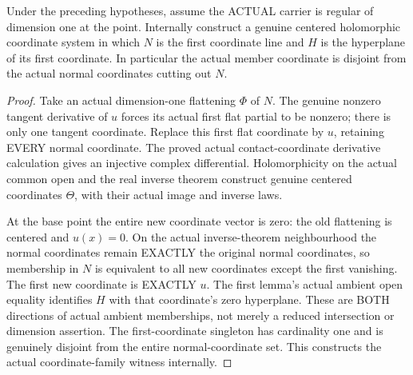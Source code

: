 \begin{theorem}
\label{hir:sharp-actual-order-one-curve-member-simultaneous-coordinates}
\leanok
Under the preceding hypotheses, assume the ACTUAL carrier is regular of
dimension one at the point. Internally construct a genuine centered
holomorphic coordinate system in which $N$ is the first coordinate
line and $H$ is the hyperplane of its first coordinate. In particular
the actual member coordinate is disjoint from the actual normal
coordinates cutting out $N$.
\end{theorem}
\begin{proof}
Take an actual dimension-one flattening $\Phi$ of $N$. The genuine
nonzero tangent derivative of $u$ forces its actual first flat partial
to be nonzero; there is only one tangent coordinate. Replace this first
flat coordinate by $u$, retaining EVERY normal coordinate. The proved
actual contact-coordinate derivative calculation gives an injective
complex differential. Holomorphicity on the actual common open and
the real inverse theorem construct genuine centered coordinates
$\Theta$, with their actual image and inverse laws.

At the base point the entire new coordinate vector is zero: the old
flattening is centered and $u(x)=0$. On the actual inverse-theorem
neighbourhood the normal coordinates remain EXACTLY the original
normal coordinates, so membership in $N$ is equivalent to all new
coordinates except the first vanishing. The first new coordinate is
EXACTLY $u$. The first lemma's actual ambient open equality identifies
$H$ with that coordinate's zero hyperplane. These are BOTH directions
of actual ambient memberships, not merely a reduced intersection or
dimension assertion. The first-coordinate singleton has cardinality
one and is genuinely disjoint from the entire normal-coordinate set.
This constructs the actual coordinate-family witness internally.
\end{proof}

